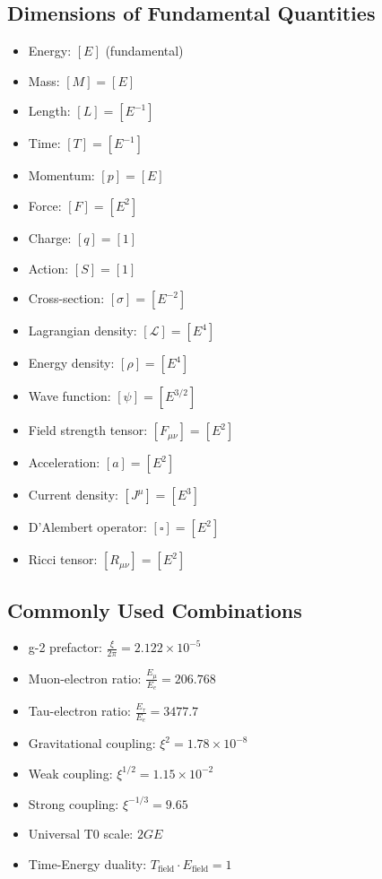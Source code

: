 \documentclass[12pt,a4paper]{article}
\begin{document}
	\subsection{Dimensions of Fundamental Quantities}
	\begin{itemize}
		\item Energy: $[E]$ (fundamental)
		\item Mass: $[M] = [E]$
		\item Length: $[L] = [E^{-1}]$
		\item Time: $[T] = [E^{-1}]$
		\item Momentum: $[p] = [E]$
		\item Force: $[F] = [E^2]$
		\item Charge: $[q] = [1]$
		\item Action: $[S] = [1]$
		\item Cross-section: $[\sigma] = [E^{-2}]$
		\item Lagrangian density: $[\mathcal{L}] = [E^4]$
		\item Energy density: $[\rho] = [E^4]$
		\item Wave function: $[\psi] = [E^{3/2}]$
		\item Field strength tensor: $[F_{\mu\nu}] = [E^2]$
		\item Acceleration: $[a] = [E^2]$
		\item Current density: $[J^\mu] = [E^3]$
		\item D'Alembert operator: $[\square] = [E^2]$
		\item Ricci tensor: $[R_{\mu\nu}] = [E^2]$
	\end{itemize}
	
	\subsection{Commonly Used Combinations}
	\begin{itemize}
		\item g-2 prefactor: $\frac{\xi}{2\pi} = 2.122 \times 10^{-5}$
		\item Muon-electron ratio: $\frac{E_\mu}{E_e} = 206.768$
		\item Tau-electron ratio: $\frac{E_\tau}{E_e} = 3477.7$
		\item Gravitational coupling: $\xi^2 = 1.78 \times 10^{-8}$
		\item Weak coupling: $\xi^{1/2} = 1.15 \times 10^{-2}$
		\item Strong coupling: $\xi^{-1/3} = 9.65$
		\item Universal T0 scale: $2GE$
		\item Time-Energy duality: $T_{\text{field}} \cdot E_{\text{field}} = 1$
	\end{itemize}
	
\end{document}
